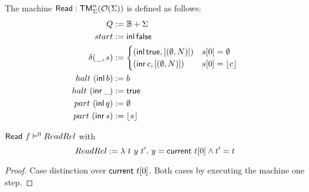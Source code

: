 \begin{definition}[$\MS{Read}$][ReadChar]
  The machine $\mathsf{Read} : \mathsf{TM}_\Sigma^n(\mathcal{O}(\Sigma))$ is defined as follows:
  \begin{align*}
    Q          &:= \mathbb{B}+\Sigma \\
    start      &:= \operatorname{\mathsf{inl}} \mathsf{false} \\
    \delta (\_, s) &:=
                     \begin{cases}
                       (\operatorname{\mathsf{inl}} \mathsf{true}, \left[ (\emptyset, N) \right]) & s[0] = \emptyset \\
                       (\operatorname{\mathsf{inr}} c, \left[ (\emptyset, N) \right])     & s[0] = \left\lfloor {c} \right\rfloor
                     \end{cases} \\
    halt   ~ (\operatorname{\mathsf{inl}}  b) &:= b \\
    halt   ~ (\operatorname{\mathsf{inr}} \_) &:= \mathsf{true} \\
    part   ~ (\operatorname{\mathsf{inl}}  q) &:= \emptyset \\
    part   ~ (\operatorname{\mathsf{inr}}  s) &:= \left\lfloor {s} \right\rfloor
  \end{align*}
\end{definition}


\begin{lemma}
  \label{lem:Read_Sem} $\mathsf{Read}~f \mathrel{\vDash^{0}} ReadRel$ with
  \[
    ReadRel := \lambda~t~y~t'.~ y = \mathsf{current}~t[0] \land t' = t
  \]
\end{lemma}
\begin{proof}
  Case distinction over $\mathsf{current}~t[0]$.  Both cases by executing the machine one step.
\end{proof}



